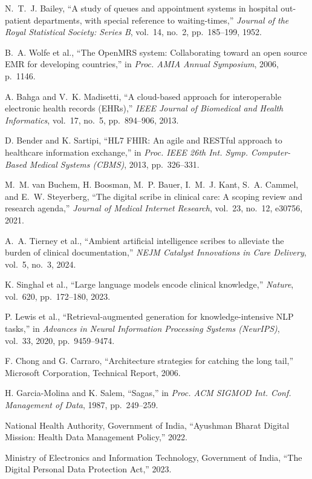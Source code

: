 \documentclass[12pt,a4paper]{article}
\begin{document}
{\footnotesize
\begin{enumerate}[leftmargin=16pt,itemsep=3pt,topsep=2pt,parsep=0pt,label={[\arabic*]}]
  \item N.~T.~J. Bailey, ``A study of queues and appointment systems in hospital out-patient departments, with special reference to waiting-times,'' \textit{Journal of the Royal Statistical Society: Series B}, vol.~14, no.~2, pp.~185--199, 1952.
  \item B.~A. Wolfe et al., ``The OpenMRS system: Collaborating toward an open source EMR for developing countries,'' in \textit{Proc. AMIA Annual Symposium}, 2006, p.~1146.
  \item A. Bahga and V.~K. Madisetti, ``A cloud-based approach for interoperable electronic health records (EHRs),'' \textit{IEEE Journal of Biomedical and Health Informatics}, vol.~17, no.~5, pp.~894--906, 2013.
  \item D. Bender and K. Sartipi, ``HL7 FHIR: An agile and RESTful approach to healthcare information exchange,'' in \textit{Proc. IEEE 26th Int. Symp. Computer-Based Medical Systems (CBMS)}, 2013, pp.~326--331.
  \item M.~M. van Buchem, H. Boosman, M.~P. Bauer, I.~M.~J. Kant, S.~A. Cammel, and E.~W. Steyerberg, ``The digital scribe in clinical care: A scoping review and research agenda,'' \textit{Journal of Medical Internet Research}, vol.~23, no.~12, e30756, 2021.
  \item A.~A. Tierney et al., ``Ambient artificial intelligence scribes to alleviate the burden of clinical documentation,'' \textit{NEJM Catalyst Innovations in Care Delivery}, vol.~5, no.~3, 2024.
  \item K. Singhal et al., ``Large language models encode clinical knowledge,'' \textit{Nature}, vol.~620, pp.~172--180, 2023.
  \item P. Lewis et al., ``Retrieval-augmented generation for knowledge-intensive NLP tasks,'' in \textit{Advances in Neural Information Processing Systems (NeurIPS)}, vol.~33, 2020, pp.~9459--9474.
  \item F. Chong and G. Carraro, ``Architecture strategies for catching the long tail,'' Microsoft Corporation, Technical Report, 2006.
  \item H. Garcia-Molina and K. Salem, ``Sagas,'' in \textit{Proc. ACM SIGMOD Int. Conf. Management of Data}, 1987, pp.~249--259.
  \item National Health Authority, Government of India, ``Ayushman Bharat Digital Mission: Health Data Management Policy,'' 2022.
  \item Ministry of Electronics and Information Technology, Government of India, ``The Digital Personal Data Protection Act,'' 2023.
\end{enumerate}}
\end{document}
